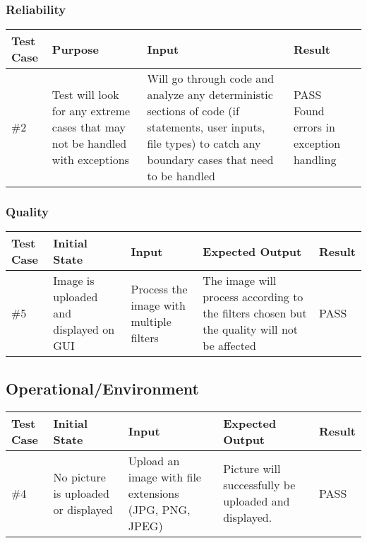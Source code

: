 \documentclass[12pt, titlepage]{article}
\begin{document}
\newpage

\subsubsection{Reliability}
\begin{table}[!hb]
\scriptsize
\begin{tabu} to 1.1\textwidth { | X[.3] | X[.7] | X[.7] | X[.7] |}
\hline
	      		Test Case & Purpose & Input & Result \\
\hline
\#2
& Test will look for any extreme cases that may not be handled with exceptions
& Will go through code and analyze any deterministic sections of code (if statements, user inputs, file types) to catch any boundary cases that need to be handled
& PASS Found errors in exception handling\\
\hline
	\end{tabu}
	\end{table}

\subsubsection{Quality}
\begin{table}[!hb]
\scriptsize
\begin{tabu} to 1.1\textwidth { | X[.3] | X[.7] | X[.7] | X[.7] | X[.3] |}
\hline
	      		Test Case & Initial State & Input & Expected Output & Result \\
\hline
\#5
& Image is uploaded and displayed on GUI
& Process the image with multiple filters
& The image will process according to the filters chosen but the quality will not be affected
& PASS\\
\hline
	\end{tabu}
	\end{table}

\subsection{Operational/Environment}
\begin{table}[!hb]
\scriptsize
\begin{tabu} to 1.1\textwidth { | X[.3] | X[.7] | X[.7] | X[.7] | X[.3] |}
\hline
	      		Test Case & Initial State & Input & Expected Output & Result \\
\hline
\#4
& No picture is uploaded or displayed
& Upload an image with file extensions (JPG, PNG, JPEG)
& Picture will successfully be uploaded and displayed.
& PASS\\
\hline
	\end{tabu}
	\end{table}
\end{document}
